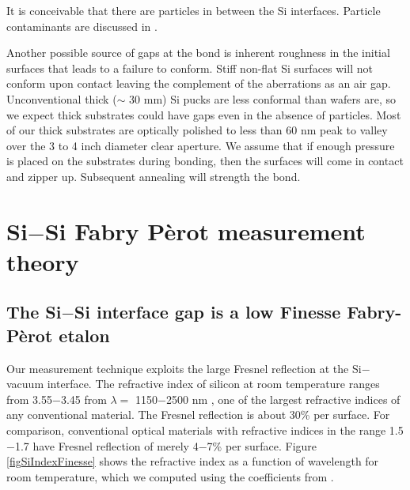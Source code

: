 \documentclass[osajnl,preprint,showpacs,superscriptaddress,12pt]{revtex4-1} %
\begin{document}
It is conceivable that there are particles in between the Si interfaces.  Particle contaminants are discussed in \cite{Mitani1990}.

Another possible source of gaps at the bond is inherent roughness in the initial surfaces that leads to a failure to conform.  Stiff non-flat Si surfaces will not conform upon contact leaving the complement of the aberrations as an air gap. Unconventional thick ($\sim$ 30 mm) Si pucks are less conformal than wafers are, so we expect thick substrates could have gaps even in the absence of particles.  Most of our thick substrates are optically polished to less than 60 nm peak to valley over the 3 to 4 inch diameter clear aperture.  We assume that if enough pressure is placed on the substrates during bonding, then the surfaces will come in contact and zipper up.  Subsequent annealing will strength the bond.

\section{Si$-$Si Fabry P\`{e}rot measurement theory}
\label{secTheory}

\subsection{The Si$-$Si interface gap is a low Finesse Fabry-P\`{e}rot etalon}

Our measurement technique exploits the large Fresnel reflection \cite{2001opt4.book.....H} at the Si$-$vacuum interface.  The refractive index of silicon at room temperature ranges from 3.55$-$3.45 from $\lambda = $ 1150$-$2500 nm \cite{2006SPIE.6273E..77F}, one of the largest refractive indices of any conventional material.  The Fresnel reflection is about 30\% per surface.  For comparison, conventional optical materials with refractive indices in the range 1.5$-$1.7 have Fresnel reflection of merely 4$-$7\% per surface.  Figure \ref{figSiIndexFinesse} shows the refractive index as a function of wavelength for room temperature, which we computed using the coefficients from \cite{2006SPIE.6273E..77F}.
\end{document}
